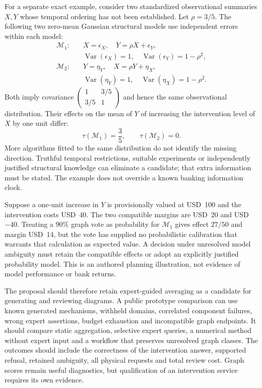 For a separate exact example, consider two standardized observational summaries
$X,Y$ whose temporal ordering has not been established. Let
$\rho=3/5$. The following two zero-mean Gaussian structural models use
independent errors within each model:
\begin{equation}
 \begin{aligned}
 \mathcal M_1:\quad &X=\epsilon_X,\quad Y=\rho X+\epsilon_Y,\\
 &\operatorname{Var}(\epsilon_X)=1,\quad
 \operatorname{Var}(\epsilon_Y)=1-\rho^2,\\[2pt]
 \mathcal M_2:\quad &Y=\eta_Y,\quad X=\rho Y+\eta_X,\\
 &\operatorname{Var}(\eta_Y)=1,\quad
 \operatorname{Var}(\eta_X)=1-\rho^2.
 \end{aligned}
 \label{exec20:expert-worlds}
\end{equation}
Both imply covariance
$\left(\begin{smallmatrix}1&3/5\\3/5&1\end{smallmatrix}\right)$ and hence the
same observational distribution. Their effects on the mean of $Y$ of increasing
the intervention level of $X$ by one unit differ:
\begin{equation}
 \tau(\mathcal M_1)=\frac35,\qquad \tau(\mathcal M_2)=0.
 \label{exec20:expert-effects}
\end{equation}
More algorithms fitted to the same distribution do not identify the missing
direction. Truthful temporal restrictions, suitable experiments or independently
justified structural knowledge can eliminate a candidate; that extra information
must be stated. The example does not override a known banking information clock.
\citep{exec20_expert_averaging_reference}

Suppose a one-unit increase in $Y$ is provisionally valued at USD~100 and the
intervention costs USD~40. The two compatible margins are USD~20 and USD~$-40$.
Treating a 90\% graph vote as probability for $\mathcal M_1$ gives effect
$27/50$ and margin USD~14, but the vote has supplied no probabilistic calibration
that warrants that calculation as expected value. A decision under unresolved
model ambiguity must retain the compatible effects or adopt an explicitly
justified probability model. This is an authored planning illustration, not
evidence of model performance or bank returns. \citep{exec20_expert_averaging_reference}

The proposal should therefore retain expert-guided averaging as a candidate
for generating and reviewing diagrams. A public prototype comparison can use
known generated mechanisms, withheld domains, correlated component failures,
wrong expert assertions, budget exhaustion and incompatible graph endpoints.
It should compare static aggregation, selective expert queries, a numerical
method without expert input and a workflow that preserves unresolved graph
classes. The outcomes should include the correctness of the intervention
answer, supported refusal, retained ambiguity, all physical requests and total
review cost. Graph scores remain useful diagnostics, but qualification of an
intervention service requires its own evidence.


